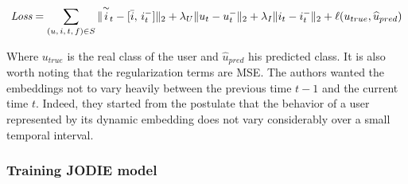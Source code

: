 \begin{equation}
    \textit{Loss} = \sum_{(u,\,i,\,t,\,f) \in S} \| \overset{\sim}{i}_t - [\Bar{i},\,i_t^-] \|_2 + \lambda_U \|u_t - u_t^-\|_2 + \lambda_I \|i_t - i_t^-\|_2 + \ell (u_{true}, \widehat u_{pred})
\end{equation}

Where $u_{true}$ is the real class of the user and $\widehat u_{pred}$ his predicted class. It is also worth noting that the %
regularization terms are MSE. The authors wanted the embeddings not to vary heavily between the previous time $t-1$ and the current time $t$. Indeed, they started from the postulate that the behavior of a user represented by its dynamic embedding does not vary considerably over a small temporal interval.\\

\subsubsection{Training JODIE model} 
\label{sec:trainning}

